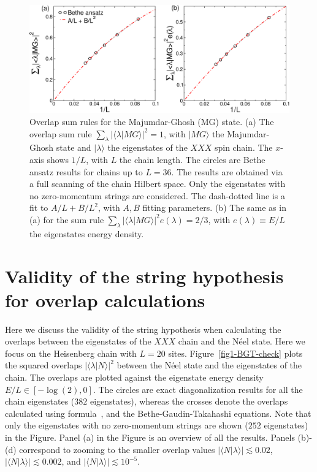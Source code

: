 \documentclass[11pt]{iopart}
\begin{document}
\begin{figure}[t]
\begin{center}
\includegraphics[width=.9\textwidth]{./draft_figs/Dimer}
\end{center}
\caption{ Overlap sum rules for the Majumdar-Ghosh (MG) state. (a) The 
 overlap sum rule $\sum_{\lambda}|\langle\lambda|MG\rangle|^2=1$, 
 with $|MG\rangle$ the Majumdar-Ghosh state and $|\lambda\rangle$ 
 the eigenstates  of the $XXX$ spin chain. The $x$-axis shows $1/L$, 
 with $L$ the chain length. The circles are Bethe ansatz results for 
 chains up to $L=36$. The results are obtained via a full scanning of 
 the chain Hilbert space. Only the eigenstates with no zero-momentum 
 strings are considered. The dash-dotted line is a fit to $A/L+B/L^2$, 
 with $A,B$ fitting parameters. (b) The same as in (a) for the sum 
 rule $\sum_{\lambda}|\langle\lambda|MG\rangle|^2e(\lambda)=
 2/3$, with $e(\lambda)\equiv E/L$  the eigenstates energy density. 
}
\label{fig3-dimer-sr}
\end{figure}

\section{Validity of the string hypothesis for overlap calculations}
\label{string-ov}

Here we discuss the validity of the string hypothesis when calculating the 
overlaps between the eigenstates of the $XXX$ chain and the N\'eel state. 
Here we focus on the Heisenberg chain with $L=20$ sites. 
Figure~\ref{fig1-BGT-check} plots the squared overlaps $|\langle\lambda|
N\rangle|^2$ between the N\'eel state and the eigenstates of the chain. 
The overlaps are plotted against the eigenstate energy density $E/L
\in[-\log(2),0]$. The circles are exact diagonalization results for all 
the chain eigenstates ($382$ eigenstates), whereas the crosses denote the 
overlaps calculated using formula~, and the 
Bethe-Gaudin-Takahashi equations. Note that only the eigenstates with 
no zero-momentum strings are shown ($252$ eigenstates) in the Figure. 
Panel (a) in the Figure is an overview of all the results. Panels (b)-(d) 
correspond to zooming to the smaller overlap values $|\langle N|\lambda
\rangle|\lesssim 0.02$, $|\langle N|\lambda\rangle|\lesssim 0.002$, and 
$|\langle N|\lambda\rangle|\lesssim 10^{-5}$. 
\end{document}
